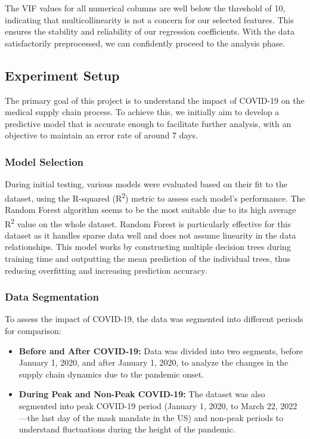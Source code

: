 \documentclass[12pt]{report}
\begin{document}
\noindent
The VIF values for all numerical columns are well below the threshold of 10, indicating that multicollinearity is not a concern for our selected features. This ensures the stability and reliability of our regression coefficients. With the data satisfactorily preprocessed, we can confidently proceed to the analysis phase.

\subsection{Experiment Setup}
The primary goal of this project is to understand the impact of COVID-19 on the medical supply chain process. To achieve this, we initially aim to develop a predictive model that is accurate enough to facilitate further analysis, with an objective to maintain an error rate of around 7 days.

\subsubsection{Model Selection}
During initial testing, various models were evaluated based on their fit to the dataset, using the R-squared (R\textsuperscript{2}) metric to assess each model's performance. The Random Forest algorithm seems to be the most suitable due to its high average R\textsuperscript{2} value on the whole dataset. Random Forest is particularly effective for this dataset as it handles sparse data well and does not assume linearity in the data relationships. This model works by constructing multiple decision trees during training time and outputting the mean prediction of the individual trees, thus reducing overfitting and increasing prediction accuracy.

\subsubsection{Data Segmentation}
To assess the impact of COVID-19, the data was segmented into different periods for comparison:
\begin{itemize}
  \item \textbf{Before and After COVID-19:} Data was divided into two segments, before January 1, 2020, and after January 1, 2020, to analyze the changes in the supply chain dynamics due to the pandemic onset.
  \item \textbf{During Peak and Non-Peak COVID-19:} The dataset was also segmented into peak COVID-19 period (January 1, 2020, to March 22, 2022—the last day of the mask mandate in the US) and non-peak periods to understand fluctuations during the height of the pandemic.
\end{itemize}
\end{document}
